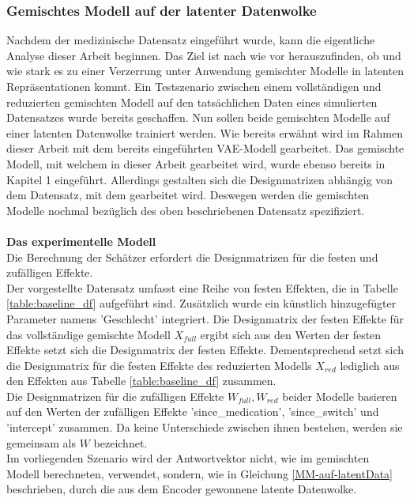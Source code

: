 \documentclass[%
thesis=student,%
coverpage=false,%
titlepage=false,%
headmarks=true, %
german,%
font=libertine, %
math=newpxtx, %
BCOR=5mm,%
coverBCOR=11mm%
]{tumbook}
\theoremstyle{break}
\begin{document}
\subsubsection{Gemischtes Modell auf der latenter Datenwolke}
Nachdem der medizinische Datensatz eingeführt wurde, kann die eigentliche Analyse dieser Arbeit beginnen. Das Ziel ist nach wie vor herauszufinden, ob und wie stark es zu einer Verzerrung unter Anwendung gemischter Modelle in latenten Repräsentationen kommt. Ein Testszenario zwischen einem vollständigen und reduzierten gemischten Modell auf den tatsächlichen Daten eines simulierten Datensatzes wurde bereits geschaffen. Nun sollen beide gemischten Modelle auf einer latenten Datenwolke trainiert werden. Wie bereits erwähnt wird im Rahmen dieser Arbeit mit dem bereits eingeführten VAE-Modell gearbeitet. Das gemischte Modell, mit welchem in dieser Arbeit gearbeitet wird, wurde ebenso bereits in Kapitel 1 eingeführt. Allerdings gestalten sich die Designmatrizen abhängig von dem Datensatz, mit dem gearbeitet wird. Deswegen werden die gemischten Modelle nochmal bezüglich des oben beschriebenen Datensatz spezifiziert.\\
\\
\textbf{Das experimentelle Modell}\\
Die Berechnung der Schätzer erfordert die Designmatrizen für die festen und zufälligen Effekte. \\
Der vorgestellte Datensatz umfasst eine Reihe von festen Effekten, die in Tabelle \ref{table:baseline_df} aufgeführt sind. Zusätzlich wurde ein künstlich hinzugefügter Parameter namens 'Geschlecht' integriert. Die Designmatrix der festen Effekte für das vollständige gemischte Modell $X_{full}$ ergibt sich aus den Werten der festen Effekte setzt sich die Designmatrix der festen Effekte. Dementsprechend setzt sich die Designmatrix für die festen Effekte des reduzierten Modells $X_{red}$ lediglich aus den Effekten aus Tabelle \ref{table:baseline_df} zusammen.\\
Die Designmatrizen für die zufälligen Effekte $W_{full}, W_{red}$ beider Modelle basieren auf den Werten der zufälligen Effekte 'since\_medication', 'since\_switch' und 'intercept' zusammen. Da keine Unterschiede zwischen ihnen bestehen, werden sie gemeinsam als $W$ bezeichnet.\\ 
Im vorliegenden Szenario wird der Antwortvektor nicht, wie im gemischten Modell berechneten, verwendet, sondern, wie in Gleichung \ref{MM-auf-latentData} beschrieben, durch die aus dem Encoder gewonnene latente Datenwolke.\\
\end{document}
